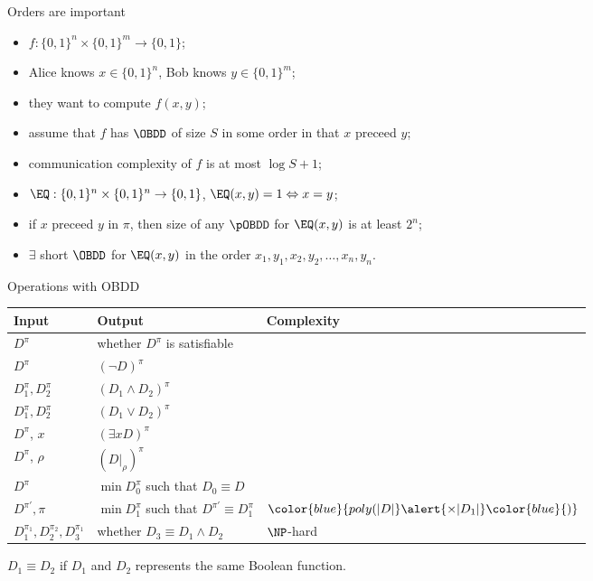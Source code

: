 \begin{frame}{Orders are important}
    \begin{itemize}
        \item $f: \{0, 1\}^n \times \{0, 1\}^m \to \{0, 1\}$;
        \item Alice knows $x \in \{0, 1\}^n$, Bob knows $y \in \{0, 1\}^m$;
        \item they want to compute $f(x, y)$;
        \pause
        \item assume that $f$ has $\OBDD$ of size $S$ in some order in that $x$ preceed $y$;
        \item communication complexity of $f$ is at most $\log S + 1$;
        \pause
        \item $\EQ: \{0, 1\}^n \times \{0, 1\}^n \to \{0, 1\}$, $\EQ(x, y) = 1 \Leftrightarrow x = y$;
        \item if $x$ preceed $y$ in $\pi$, then size of any $\pOBDD$ for $\EQ(x, y)$ is at least $2^n$;
        \pause
        \item $\exists$ short $\OBDD$ for $\EQ(x, y)$ in the order $x_1, y_1, x_2, y_2, \dots, x_n, y_n$.
    \end{itemize}
\end{frame}


\begin{frame}{Operations with OBDD}
      \begin{tabular}{|l|l|l|}
        \hline
        Input & Output & Complexity \\
        \hline
        $D^{\pi}$ & whether $D^{\pi}$ is satisfiable & \color{blue}{$O(|D|)$} \\
        \hline
        $D^{\pi}$ &  $(\lnot D)^{\pi}$ & \color{blue}{$O(|D|)$} \\
        \hline
        $D_1^{\pi}, D_2^{\pi}$ &  $(D_1\land D_2)^{\pi}$ & \color{blue}{$O(|D_1|\times |D_2|)$} \\
        \hline
        $D_1^{\pi}, D_2^{\pi}$ &  $(D_1\lor D_2)^{\pi}$ & \color{blue}{$O(|D_1|\times |D_2|)$} \\
        \hline
        $D^{\pi}$, $x$ &  $(\exists x D)^{\pi}$ & \color{blue}{$O(|D|)$} \\
        \hline
        $D^{\pi}$, $\rho$  &  $(D|_\rho)^{\pi}$ & \color{blue}{$O(|D|)$} \\
        \hline
        $D^{\pi}$ &  $\min D_0^{\pi}$ such that $D_0 \equiv D$ & \color{blue}{$O(|D|)$} \\
        \hline
        $D^{\pi'}, \pi$ &  $\min D_1^{\pi}$ such that $D^{\pi'} \equiv D_1^{\pi}$ &
                                    $\color{blue}{poly(|D|} \alert{\times |D_1|} \color{blue}{)}$ \\
        \hline
        $D_1^{\pi_1}, D_2^{\pi_2}, D_3^{\pi_1}$ & whether $D_3 \equiv D_1 \land D_2$ & \alert{$\NP$-hard} \\
        \hline
    \end{tabular}

    \bigskip
	$D_1 \equiv D_2$ if $D_1$ and $D_2$ represents the same Boolean function.
\end{frame}
